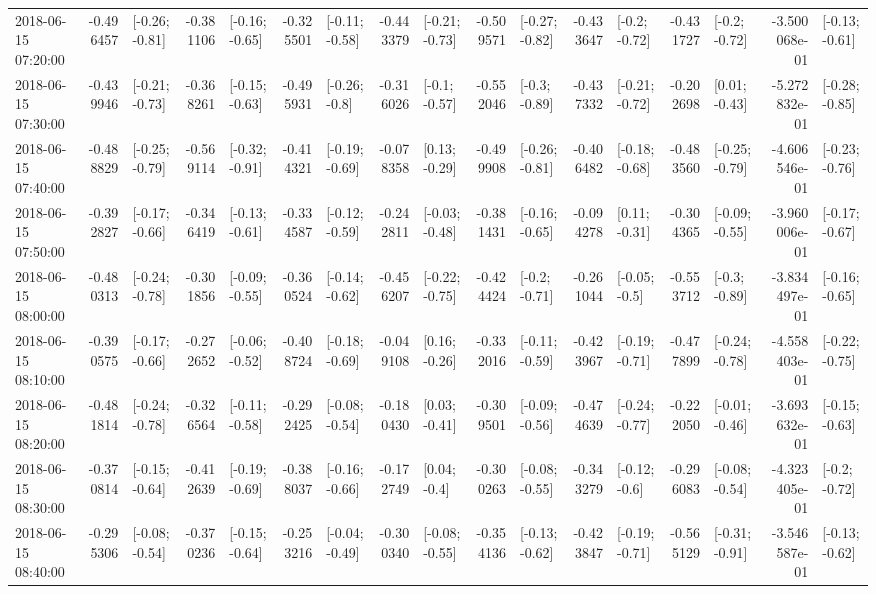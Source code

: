 \begin{tabular}{lrlrlrlrlrlrlrlrl}
2018-06-15 07:20:00 & -0.496457 &  [-0.26; -0.81] & -0.381106 &  [-0.16; -0.65] & -0.325501 &  [-0.11; -0.58] & -0.443379 &  [-0.21; -0.73] & -0.509571 &  [-0.27; -0.82] & -0.433647 &   [-0.2; -0.72] & -0.431727 &   [-0.2; -0.72] & -3.500068e-01 &  [-0.13; -0.61] \\
2018-06-15 07:30:00 & -0.439946 &  [-0.21; -0.73] & -0.368261 &  [-0.15; -0.63] & -0.495931 &   [-0.26; -0.8] & -0.316026 &   [-0.1; -0.57] & -0.552046 &   [-0.3; -0.89] & -0.437332 &  [-0.21; -0.72] & -0.202698 &   [0.01; -0.43] & -5.272832e-01 &  [-0.28; -0.85] \\
2018-06-15 07:40:00 & -0.488829 &  [-0.25; -0.79] & -0.569114 &  [-0.32; -0.91] & -0.414321 &  [-0.19; -0.69] & -0.078358 &   [0.13; -0.29] & -0.499908 &  [-0.26; -0.81] & -0.406482 &  [-0.18; -0.68] & -0.483560 &  [-0.25; -0.79] & -4.606546e-01 &  [-0.23; -0.76] \\
2018-06-15 07:50:00 & -0.392827 &  [-0.17; -0.66] & -0.346419 &  [-0.13; -0.61] & -0.334587 &  [-0.12; -0.59] & -0.242811 &  [-0.03; -0.48] & -0.381431 &  [-0.16; -0.65] & -0.094278 &   [0.11; -0.31] & -0.304365 &  [-0.09; -0.55] & -3.960006e-01 &  [-0.17; -0.67] \\
2018-06-15 08:00:00 & -0.480313 &  [-0.24; -0.78] & -0.301856 &  [-0.09; -0.55] & -0.360524 &  [-0.14; -0.62] & -0.456207 &  [-0.22; -0.75] & -0.424424 &   [-0.2; -0.71] & -0.261044 &   [-0.05; -0.5] & -0.553712 &   [-0.3; -0.89] & -3.834497e-01 &  [-0.16; -0.65] \\
2018-06-15 08:10:00 & -0.390575 &  [-0.17; -0.66] & -0.272652 &  [-0.06; -0.52] & -0.408724 &  [-0.18; -0.69] & -0.049108 &   [0.16; -0.26] & -0.332016 &  [-0.11; -0.59] & -0.423967 &  [-0.19; -0.71] & -0.477899 &  [-0.24; -0.78] & -4.558403e-01 &  [-0.22; -0.75] \\
2018-06-15 08:20:00 & -0.481814 &  [-0.24; -0.78] & -0.326564 &  [-0.11; -0.58] & -0.292425 &  [-0.08; -0.54] & -0.180430 &   [0.03; -0.41] & -0.309501 &  [-0.09; -0.56] & -0.474639 &  [-0.24; -0.77] & -0.222050 &  [-0.01; -0.46] & -3.693632e-01 &  [-0.15; -0.63] \\
2018-06-15 08:30:00 & -0.370814 &  [-0.15; -0.64] & -0.412639 &  [-0.19; -0.69] & -0.388037 &  [-0.16; -0.66] & -0.172749 &    [0.04; -0.4] & -0.300263 &  [-0.08; -0.55] & -0.343279 &   [-0.12; -0.6] & -0.296083 &  [-0.08; -0.54] & -4.323405e-01 &   [-0.2; -0.72] \\
2018-06-15 08:40:00 & -0.295306 &  [-0.08; -0.54] & -0.370236 &  [-0.15; -0.64] & -0.253216 &  [-0.04; -0.49] & -0.300340 &  [-0.08; -0.55] & -0.354136 &  [-0.13; -0.62] & -0.423847 &  [-0.19; -0.71] & -0.565129 &  [-0.31; -0.91] & -3.546587e-01 &  [-0.13; -0.62] \\

\end{tabular}
